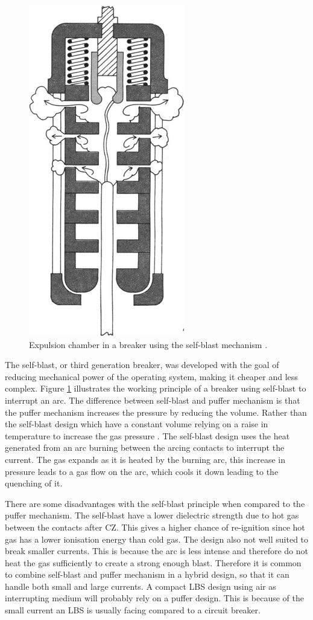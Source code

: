 \documentclass[10pt,a4paper,twoside]{article}
\begin{document}
\begin{figure} [H]
\centering
\includegraphics[scale=0.5]{Bilder/Theory/selfBlast.png}
\caption{Expulsion chamber in a breaker using the self-blast mechanism \cite{bib:CBAC}.} \label{fig:selfBlast}
\end{figure}

The self-blast, or third generation breaker, was developed with the goal of reducing mechanical power of the operating system, making it cheaper and less complex. Figure \ref{fig:selfBlast} illustrates the working principle of a breaker using self-blast to interrupt an arc. The difference between self-blast and puffer mechanism is that the puffer mechanism increases the pressure by reducing the volume. Rather than the self-blast design which have a constant volume relying on a raise in temperature to increase the gas pressure \cite{bib:CBAC}. The self-blast design uses the heat generated from an arc burning between the arcing contacts to interrupt the current. The gas expands as it is heated by the burning arc, this increase in pressure leads to a gas flow on the arc, which cools it down leading to the quenching of it.

There are some disadvantages with the self-blast principle when compared to the puffer mechanism. The self-blast have a lower dielectric strength due to hot gas between the contacts after CZ. This gives a higher chance of re-ignition since hot gas has a lower ionisation energy than cold gas. The design also not well suited to break smaller currents. This is because the arc is less intense and therefore do not heat the gas sufficiently to create a strong enough blast. Therefore it is common to combine self-blast and puffer mechanism in a hybrid design, so that it can handle both small and large currents. A compact LBS design using air as interrupting medium will probably rely on a puffer design. This is because of the small current an LBS is usually facing compared to a circuit breaker.
\end{document}
